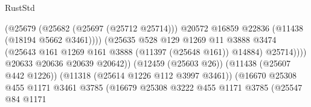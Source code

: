 \begin{lexlean}{RustStd}
\begin{coremodule}
                                                        (@25679
                                                          (@25682 (@25697 (@25712 @25714)))
                                                          @20572
                                                          @16859
                                                          @22836
                                                          (@11438 (@18194 @5662 @3461))))
                                                      (@25635
                                                        @528
                                                        @129
                                                        @1269
                                                        @11
                                                        @3888
                                                        @3474
                                                        (@25643
                                                          @161
                                                          @1269
                                                          @161
                                                          @3888
                                                          (@11397 (@25648 @161))
                                                          @14884)
                                                        @25714))))
                                                @20633
                                                @20636
                                                @20639
                                                @20642))
                                            (@12459 (@25603 @26))
                                            (@11438 (@25607 @442 @1226))
                                            (@11318 (@25614 @1226 @112 @3997 @3461))
                                            (@16670
                                              @25308
                                              @455
                                              @1171
                                              @3461
                                              @3785
                                              (@16679
                                                @25308
                                                @3222
                                                @455
                                                @1171
                                                @3785
                                                (@25547
                                                  @84
                                                  @1171

\end{coremodule}
\end{lexlean}
